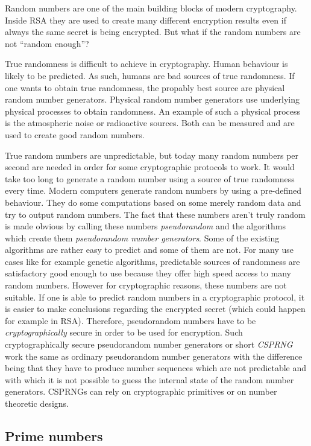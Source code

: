 Random numbers are one of the main building blocks of modern cryptography.
Inside RSA they are used to create many different encryption results even
if always the same secret is being encrypted. But what if the random numbers
are not ``random enough''?

True randomness is difficult to achieve in cryptography. Human behaviour
is likely to be predicted. As such, humans are bad sources of true randomness.
If one wants to obtain true randomness, the propably best source are physical
random number generators. Physical random number generators use underlying
physical processes to obtain randomness. An example of such a physical process
is the atmospheric noise or radioactive sources. Both can be measured and
are used to create good random numbers.

True random numbers are unpredictable, but today many random numbers per
second are needed in order for some cryptographic protocols to work. It would
take too long to generate a random number using a source of true randomness
every time. Modern computers generate random numbers by using a pre-defined behaviour.
They do some computations based on some merely random data and try to output
random numbers. The fact that these numbers aren't truly random is made obvious
by calling these numbers \textit{pseudorandom} and the algorithms which create
them \textit{pseudorandom number generators}. Some of the existing algorithms
are rather easy to predict and some of them are not. For many use cases like
for example genetic algorithms, predictable sources of randomness are satisfactory
good enough to use because they offer high speed access to many random numbers.
However for cryptographic reasons, these numbers are not suitable. If one is
able to predict random numbers in a cryptographic protocol, it is easier to
make conclusions regarding the encrypted secret (which could happen for example
in RSA). Therefore, pseudorandom numbers have to be \textit{cryptographically}
secure in order to be used for encryption. Such cryptographically secure pseudorandom
number generators or short \textit{CSPRNG} work the same as ordinary pseudorandom
number generators with the difference being that they have to produce number sequences
which are not predictable and with which it is not possible to guess the internal
state of the random number generators. CSPRNGs can rely on cryptographic primitives
or on number theoretic designs.

\subsection{Prime numbers}

